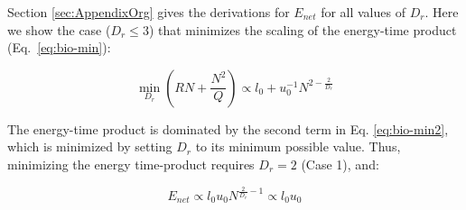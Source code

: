 \documentclass[12pt]{article}
\begin{document}
Section \ref{sec:AppendixOrg} gives the derivations for $E_{net}$
for all values of $D_r$. Here we show the case ($D_r \leq 3$) that minimizes
the scaling of the energy-time product (Eq.~\ref{eq:bio-min}):

\begin{equation}
  \min_{D_r} (RN + \frac{N^2}{Q})
  \propto l_0 + u_0^{-1}N^{2-\frac{2}{D_r}}
\label{eq:bio-min2}
\end{equation}


The energy-time product is dominated by the second term in Eq.
\ref{eq:bio-min2}, which is minimized by setting $D_r$ to its minimum possible
value. Thus, minimizing the energy time-product requires $D_r = 2$
(Case 1), and:

\begin{equation}
E_{net} \propto l_0 u_0 N^{\frac{2}{D_r}-1} \propto l_0 u_0
\label{eq:EnetOrg}
\end{equation}
\end{document}
